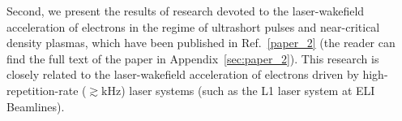 \documentclass[10pt, a4paper, twoside, openright]{report}
\begin{document}
Second, we present the results of research devoted to the laser-wakefield acceleration of electrons in the regime of ultrashort pulses and near-critical density plasmas, which have been published in Ref.~\ref{paper_2} (the reader can find the full text of the paper in Appendix~\ref{sec:paper_2}). This research is closely related to the laser-wakefield acceleration of electrons driven by high-repetition-rate ($ \gtrsim \mathrm{kHz} $) laser systems (such as the L1 laser system at ELI Beamlines). 

\end{document}
